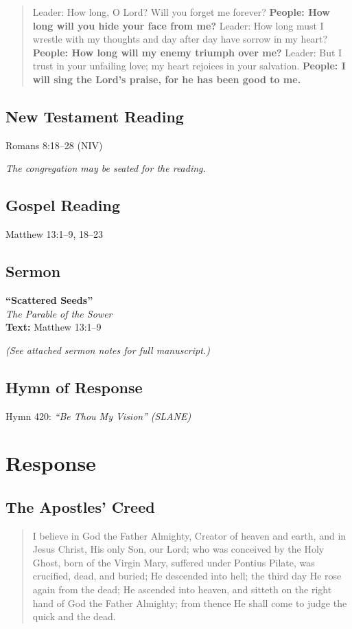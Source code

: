 \documentclass[
    language=english,
    doctype=liturgy,
    institution=none,
]{../../omnilatex}
\begin{document}
\begin{quote}
Leader: How long, O Lord? Will you forget me forever?
\textbf{People: How long will you hide your face from me?}
Leader: How long must I wrestle with my thoughts and day after day have sorrow in my heart?
\textbf{People: How long will my enemy triumph over me?}
Leader: But I trust in your unfailing love; my heart rejoices in your salvation.
\textbf{People: I will sing the Lord's praise, for he has been good to me.}
\end{quote}

\subsection{New Testament Reading}
Romans 8:18--28 (NIV)

\textit{The congregation may be seated for the reading.}

\subsection{Gospel Reading}
Matthew 13:1--9, 18--23

\subsection{Sermon}
\textbf{``Scattered Seeds''} \\
\textit{The Parable of the Sower} \\
\textbf{Text:} Matthew 13:1--9

\textit{(See attached sermon notes for full manuscript.)}

\subsection{Hymn of Response}
Hymn 420: \textit{``Be Thou My Vision''}
\textit{(SLANE)}

\section{Response}

\subsection{The Apostles' Creed}
\begin{quote}
I believe in God the Father Almighty, Creator of heaven and earth, and in Jesus Christ, His only Son, our Lord; who was conceived by the Holy Ghost, born of the Virgin Mary, suffered under Pontius Pilate, was crucified, dead, and buried; He descended into hell; the third day He rose again from the dead; He ascended into heaven, and sitteth on the right hand of God the Father Almighty; from thence He shall come to judge the quick and the dead.
\end{quote}
\end{document}
